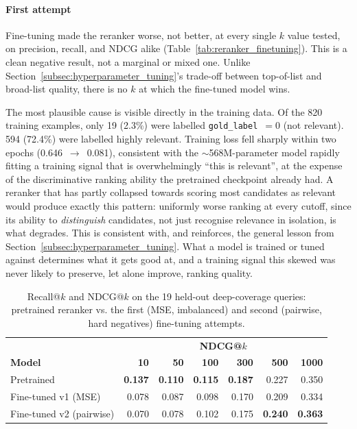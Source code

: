 \documentclass[a4paper,oneside,bibliography=totoc]{scrbook}
\begin{document}
\paragraph{First attempt} Fine-tuning made the reranker worse, not better, at every single $k$ value tested, on precision, recall, and NDCG alike (Table~\ref{tab:reranker_finetuning}). This is a clean negative result, not a marginal or mixed one. Unlike Section~\ref{subsec:hyperparameter_tuning}'s trade-off between top-of-list and broad-list quality, there is no $k$ at which the fine-tuned model wins.

The most plausible cause is visible directly in the training data. Of the 820 training examples, only 19 (2.3\%) were labelled \texttt{gold\_label}~$=0$ (not relevant). 594 (72.4\%) were labelled highly relevant. Training loss fell sharply within two epochs (0.646~$\to$~0.081), consistent with the $\sim$568M-parameter model rapidly fitting a training signal that is overwhelmingly ``this is relevant'', at the expense of the discriminative ranking ability the pretrained checkpoint already had. A reranker that has partly collapsed towards scoring most candidates as relevant would produce exactly this pattern: uniformly worse ranking at every cutoff, since its ability to \emph{distinguish} candidates, not just recognise relevance in isolation, is what degrades. This is consistent with, and reinforces, the general lesson from Section~\ref{subsec:hyperparameter_tuning}. What a model is trained or tuned against determines what it gets good at, and a training signal this skewed was never likely to preserve, let alone improve, ranking quality.

\begin{table}[ht]
\centering
\caption{Recall@$k$ and NDCG@$k$ on the 19 held-out deep-coverage queries: pretrained reranker vs. the first (MSE, imbalanced) and second (pairwise, hard negatives) fine-tuning attempts.}
\label{tab:reranker_finetuning_v2}
\begin{tabular}{lrrrrrr}
\toprule
& \multicolumn{6}{c}{\textbf{NDCG@$k$}} \\
\textbf{Model} & \textbf{10} & \textbf{50} & \textbf{100} & \textbf{300} & \textbf{500} & \textbf{1000} \\
\midrule
Pretrained          & \textbf{0.137} & \textbf{0.110} & \textbf{0.115} & \textbf{0.187} & 0.227 & 0.350 \\
Fine-tuned v1 (MSE) & 0.078 & 0.087 & 0.098 & 0.170 & 0.209 & 0.334 \\
Fine-tuned v2 (pairwise) & 0.070 & 0.078 & 0.102 & 0.175 & \textbf{0.240} & \textbf{0.363} \\
\bottomrule
\end{tabular}
\end{table}
\end{document}

